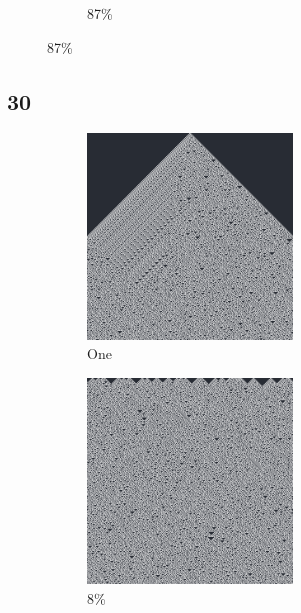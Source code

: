 \documentclass[12pt, fleqn]{report}                             %
\theoremstyle{break}                                            %
\begin{document}
\begin{figure}[ht!]
\begin{subfigure}[b]{0.4\linewidth}
          \caption{87\%}
        \end{subfigure}
      \end{figure}


      \clearpage
      \subsection{30}
      \begin{figure}[ht!]
        \centering
        \begin{subfigure}[b]{0.4\linewidth}
          \includegraphics[width=0.6\textwidth]{Images/30/a.png}
          \caption{One}
        \end{subfigure}
        \begin{subfigure}[b]{0.4\linewidth}
          \includegraphics[width=0.6\textwidth]{Images/30/b.png}
          \caption{8\%}
        \end{subfigure}
        \begin{subfigure}[b]{0.4\linewidth}

\end{subfigure}
\end{figure}
\end{document}
